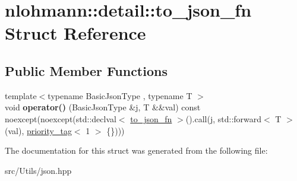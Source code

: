 \hypertarget{structnlohmann_1_1detail_1_1to__json__fn}{}\section{nlohmann\+:\+:detail\+:\+:to\+\_\+json\+\_\+fn Struct Reference}
\label{structnlohmann_1_1detail_1_1to__json__fn}
\subsection*{Public Member Functions}
\begin{DoxyCompactItemize}
\item 
\mbox{\label{structnlohmann_1_1detail_1_1to__json__fn_ac63f82d3eed085522f1cbe99a521a4d4}} 
{\footnotesize template$<$typename Basic\+Json\+Type , typename T $>$ }\\void {\bfseries operator()} (Basic\+Json\+Type \&j, T \&\&val) const noexcept(noexcept(std\+::declval$<$ \mbox{\hyperlink{structnlohmann_1_1detail_1_1to__json__fn}{to\+\_\+json\+\_\+fn}} $>$().call(j, std\+::forward$<$ T $>$(val), \mbox{\hyperlink{structnlohmann_1_1detail_1_1priority__tag}{priority\+\_\+tag}}$<$ 1 $>$ \{\})))
\end{DoxyCompactItemize}


The documentation for this struct was generated from the following file\+:\begin{DoxyCompactItemize}
\item 
src/\+Utils/json.\+hpp\end{DoxyCompactItemize}
